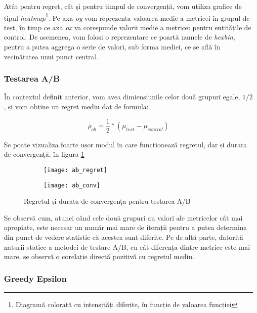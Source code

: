 Atât pentru regret, cât și pentru timpul de convergență, vom utiliza grafice de tipul \textit{heatmap}\footnote{Diagramă colorată cu intensități diferite, în funcție de valoarea funcției}. Pe axa \textit{oy} vom reprezenta valoarea medie a metricei în grupul de test, în timp ce axa \textit{ox} va corespunde valorii medie a metricei pentru entitățile de control. De asemenea, vom folosi o reprezentare ce poartă numele de \textit{hexbin}, pentru a putea aggrega o serie de valori, sub forma mediei, ce se află în vecinătatea unui punct central.

\subsubsection{Testarea A/B}

În contextul definit anterior, vom avea dimiensiunile celor două grupuri egale, $1/2$, și vom obține un regret mediu dat de formula:

\[
	\overline{\rho}_{ab} = \frac{1}{2} * (\mu_{text} - \mu_{control})
\]
	
Se poate vizualiza foarte ușor modul în care funcționează regretul, dar și durata de convergență, în figura \ref{fig:ab_evaluation}

\begin{figure}[H]
	\centering
	\begin{subfigure}{.5\textwidth}
		\centering
		\texttt{[image: ab\_regret]}
	\end{subfigure}%
	\begin{subfigure}{.5\textwidth}
		\centering
		\texttt{[image: ab\_conv]}
	\end{subfigure}
	\caption{Regretul și durata de convergența pentru testarea A/B\\}
	\label{fig:ab_evaluation}
\end{figure}

Se observă cum, atunci când cele două grupuri au valori ale metricelor cât mai apropiate, este necesar un număr mai mare de iterații pentru a putea determina din punct de vedere statistic că acestea sunt diferite. Pe de altă parte, datorită naturii statice a metodei de testare A/B, cu cât diferența dintre metrice este mai mare, se observă o corelație directă pozitivă cu regretul mediu.

\subsubsection{Greedy Epsilon}

